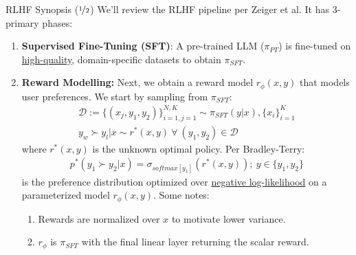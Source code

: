 \documentclass{beamer}
\begin{document}
\begin{frame}{RLHF Synopsis ($\nicefrac{1}{2}$)}
	We'll review the RLHF pipeline per Zeiger et al. It has 3-primary phases:
	\begin{enumerate}[label=\arabic*.]
		\item \textbf{Supervised Fine-Tuning (SFT)}: A pre-trained LLM ($\pi_{PT}$) is fine-tuned on \underline{high-quality}, domain-specific datasets to obtain $\pi_{SFT}$. \pause
		\item \textbf{Reward Modelling:} Next, we obtain a reward model $r_\phi(x,y)$ that models user preferences. \pause We start by sampling from $\pi_{SFT}$:
			\begin{gather}
				\mathcal{D} := \{(x_j, y_1, y_2)\}^{N,K}_{i=1,j=1} \sim \pi_{SFT}(y|x), \{x_i\}^K_{i=1} \\
				y_w \succ y_l | x \sim r^*(x,y)~\forall~(y_1, y_2) \in \mathcal{D}
			\end{gather}
			where $r^*(x,y)$ is the unknown optimal policy. \pause Per Bradley-Terry:
			\begin{gather}
				p^*(y_1 \succ y_2 | x) = \sigma_{softmax[y_1]}(r^*(x,y));~y \in \{y_1, y_2 \} \label{eq:3}
			\end{gather}
			is the preference distribution optimized over \underline{negative log-likelihood} on a parameterized model $r_\phi(x,y)$. \pause Some notes:
			\begin{enumerate}[label=\alph*.]
				\item Rewards are normalized over $x$ to motivate lower variance. \pause
				\item $r_\phi$ is $\pi_{SFT}$ with the final linear layer returning the scalar reward.
			\end{enumerate}
	\end{enumerate}
\end{frame}
\end{document}
